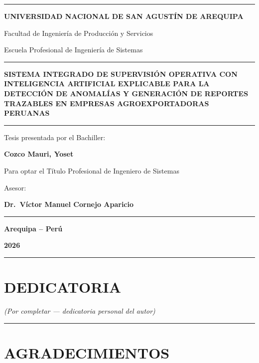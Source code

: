 \begin{center}\rule{0.5\linewidth}{0.5pt}\end{center}

\textbf{UNIVERSIDAD NACIONAL DE SAN AGUSTÍN DE AREQUIPA}

Facultad de Ingeniería de Producción y Servicios

Escuela Profesional de Ingeniería de Sistemas

\begin{center}\rule{0.5\linewidth}{0.5pt}\end{center}

\textbf{SISTEMA INTEGRADO DE SUPERVISIÓN OPERATIVA CON INTELIGENCIA
ARTIFICIAL EXPLICABLE PARA LA DETECCIÓN DE ANOMALÍAS Y GENERACIÓN DE
REPORTES TRAZABLES EN EMPRESAS AGROEXPORTADORAS PERUANAS}

\begin{center}\rule{0.5\linewidth}{0.5pt}\end{center}

Tesis presentada por el Bachiller:

\textbf{Cozco Mauri, Yoset}

Para optar el Título Profesional de Ingeniero de Sistemas

Asesor:

\textbf{Dr.~Víctor Manuel Cornejo Aparicio}

\begin{center}\rule{0.5\linewidth}{0.5pt}\end{center}

\textbf{Arequipa -- Perú}

\textbf{2026}

\begin{center}\rule{0.5\linewidth}{0.5pt}\end{center}

\section{DEDICATORIA}\label{dedicatoria}

\emph{(Por completar --- dedicatoria personal del autor)}

\begin{center}\rule{0.5\linewidth}{0.5pt}\end{center}

\section{AGRADECIMIENTOS}\label{agradecimientos}

